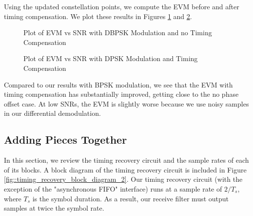 \documentclass{article}
\begin{document}
\noindent Using the updated constellation points, we compute the EVM before and after timing compensation. We plot these results in Figures \ref{fig::evm_vs_snr_dbpsk_no_comp} and \ref{fig::evm_vs_snr_dbpsk}.

\begin{figure}[H]
	\centerline{}
	\caption{Plot of EVM vs SNR with DBPSK Modulation and no Timing Compensation}
	\label{fig::evm_vs_snr_dbpsk_no_comp}
\end{figure}

\begin{figure}[H]
	\centerline{}
	\caption{Plot of EVM vs SNR with DPSK Modulation and Timing Compensation}
	\label{fig::evm_vs_snr_dbpsk}
\end{figure}

Compared to our results with BPSK modulation, we see that the EVM with timing compensation has substantially improved, getting close to the no phase offset case. At low SNRs, the EVM is slightly worse because we use noisy samples in our differential demodulation.

\subsection{Adding Pieces Together}

In this section, we review the timing recovery circuit and the sample rates of each of its blocks. A block diagram of the timing recovery circuit is included in Figure \ref{fig::timing_recovery_block_diagram_2}. Our timing recovery circuit (with the exception of the "asynchronous FIFO" interface) runs at a sample rate of $2/T_s$, where $T_s$ is the symbol duration. As a result, our receive filter must output samples at twice the symbol rate.
\end{document}
